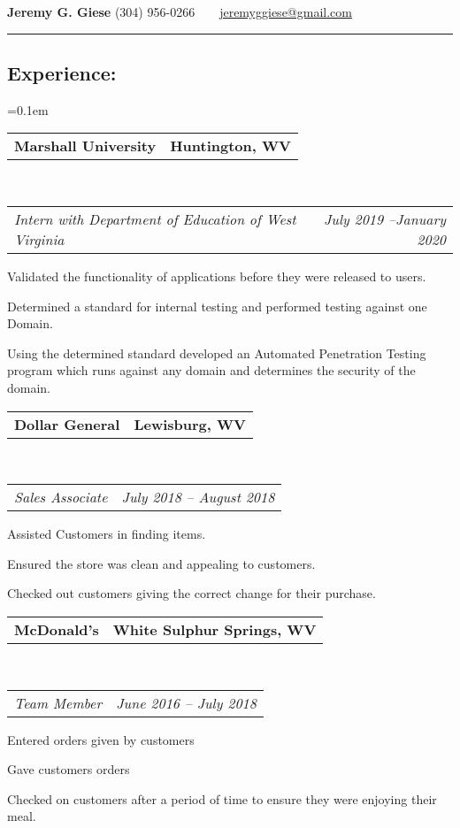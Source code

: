 \documentclass[11pt,letterpaper]{article}
\makeatletter
\newcommand{\headerrow}[2]
{\begin{tabular*}{\linewidth}{l@{\extracolsep{\fill}}r}
	#1 &
	#2 \\
\end{tabular*}}
\makeatother
\begin{document}
\begin{center}
{\LARGE \textbf{Jeremy G. Giese}}
\bigbreak
(304) 956-0266\smallbreak\ \ 
\ \ \href{mailto:jeremyggiese@gmail.com}{jeremyggiese@gmail.com}\\
\end{center}

\hrule
\vspace{-0.4em}
\subsection*{\Large{Experience:}}

	\parskip=0.1em

	\headerrow
		{\textbf{Marshall University}}
		{\textbf{Huntington, WV}}
	\\
	\headerrow
		{\hspace{0.5cm}\emph{Intern with Department of Education of West Virginia}}
		{\emph{July 2019 --January 2020}}
	\begin{itemize*}
		\item Validated the functionality of applications before they were released to users.
		\item Determined a standard for internal testing and performed testing against one Domain.
		\item Using the determined standard developed an Automated Penetration Testing program which runs against any domain and determines the security of the domain.
		\end{itemize*}

	\headerrow
		{\hspace{-0.5cm}\textbf{Dollar General}}
		{\textbf{Lewisburg, WV}}
	\\
	\headerrow
		{\hspace{0.5cm}\emph{Sales Associate}}
		{\emph{July 2018 -- August 2018}}
	\begin{itemize*}
		\item Assisted Customers in finding items.
		\item Ensured the store was clean and appealing to customers.
		\item Checked out customers giving the correct change for their purchase.
	\end{itemize*}

	\headerrow
		{\hspace{-0.5cm}\textbf{McDonald's}}
		{\textbf{White Sulphur Springs, WV}}
	\\
	\headerrow
		{\hspace{0.5cm}\emph{Team Member}}
		{\emph{June 2016 -- July 2018}}
	\begin{itemize*}
		\item Entered orders given by customers
		\item Gave customers orders
		\item Checked on customers after a period of time to ensure they were enjoying their meal.
	\end{itemize*}
\end{document}
